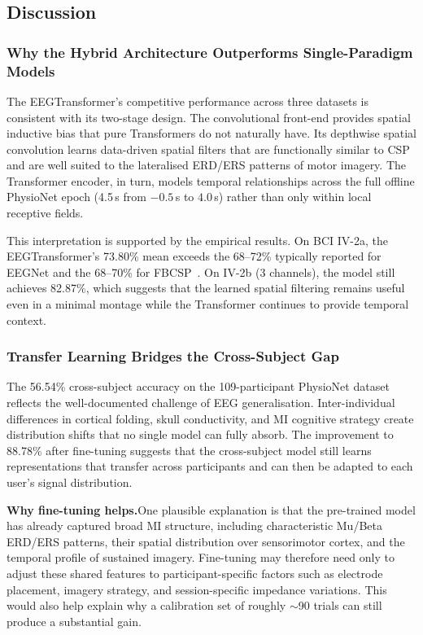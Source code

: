 \documentclass[12pt, a4paper]{article}
\begin{document}
\subsection{Discussion}

\subsubsection{Why the Hybrid Architecture Outperforms Single-Paradigm Models}
\label{sec:disc_hybrid}

The EEGTransformer's competitive performance across three datasets is consistent with its two-stage design. The convolutional front-end provides spatial inductive bias that pure Transformers do not naturally have. Its depthwise spatial convolution learns data-driven spatial filters that are functionally similar to CSP and are well suited to the lateralised ERD/ERS patterns of motor imagery. The Transformer encoder, in turn, models temporal relationships across the full offline PhysioNet epoch (4.5\,s from $-0.5$\,s to $4.0$\,s) rather than only within local receptive fields.

This interpretation is supported by the empirical results. On BCI IV-2a, the EEGTransformer's 73.80\% mean exceeds the 68--72\% typically reported for EEGNet and the 68--70\% for FBCSP~\cite{hameed2025enhancing}. On IV-2b (3 channels), the model still achieves 82.87\%, which suggests that the learned spatial filtering remains useful even in a minimal montage while the Transformer continues to provide temporal context.

\subsubsection{Transfer Learning Bridges the Cross-Subject Gap}

The 56.54\% cross-subject accuracy on the 109-participant PhysioNet dataset reflects the well-documented challenge of EEG generalisation. Inter-individual differences in cortical folding, skull conductivity, and MI cognitive strategy create distribution shifts that no single model can fully absorb. The improvement to 88.78\% after fine-tuning suggests that the cross-subject model still learns representations that transfer across participants and can then be adapted to each user's signal distribution.

\textbf{Why fine-tuning helps.}\quad One plausible explanation is that the pre-trained model has already captured broad MI structure, including characteristic Mu/Beta ERD/ERS patterns, their spatial distribution over sensorimotor cortex, and the temporal profile of sustained imagery. Fine-tuning may therefore need only to adjust these shared features to participant-specific factors such as electrode placement, imagery strategy, and session-specific impedance variations. This would also help explain why a calibration set of roughly $\sim$90 trials can still produce a substantial gain.
\end{document}
